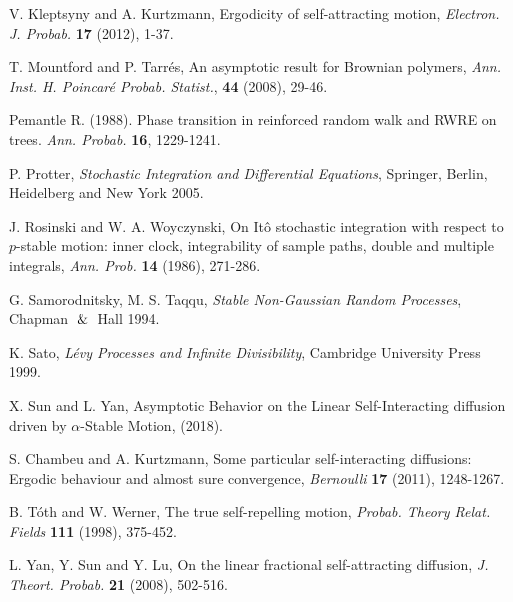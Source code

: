 \documentclass[11pt]{amsart}
\theoremstyle{plain}
\numberwithin{equation}{section}
\begin{document}
\begin{thebibliography}{0}
  V. Kleptsyny and A. Kurtzmann, Ergodicity of self-attracting motion, {\em Electron. J. Probab.} {\bf 17} (2012), 1-37.
  
  T. Mountford and P. Tarr\'es, An asymptotic result for Brownian polymers, {\it Ann. Inst. H. Poincar\'e Probab. Statist.}, {\bf 44} (2008), 29-46.
  
  Pemantle R. (1988). Phase transition in reinforced random walk and RWRE on trees. {\it Ann. Probab.} {\bf 16}, 1229-1241.
  
  P. Protter, {\it Stochastic Integration and Differential Equations}, Springer, Berlin, Heidelberg and New York 2005.
  
  J. Rosinski and W. A. Woyczynski, On It\^o stochastic integration with respect to $p$-stable motion: inner clock, integrability of sample paths, double and multiple integrals, {\it Ann. Prob.} {\bf 14} (1986), 271-286.
  
  G. Samorodnitsky, M. S. Taqqu, {\it Stable Non-Gaussian Random Processes}, Chapman $\And$ Hall 1994.
  
  K. Sato, {\it L\'evy Processes and Infinite Divisibility}, Cambridge University Press 1999.
  
  X. Sun and L. Yan, Asymptotic Behavior on the Linear Self-Interacting diffusion driven by $\alpha$-Stable Motion, (2018).
  
  S. Chambeu and A. Kurtzmann, Some particular self-interacting diffusions:
  Ergodic behaviour and almost sure convergence, {\em Bernoulli} {\bf 17} (2011), 1248-1267.
  
  B. T\'oth and W. Werner, The true self-repelling motion, {\it Probab. Theory Relat. Fields} {\bf 111} (1998), 375-452.
  
  L. Yan, Y. Sun and Y. Lu, On the linear fractional self-attracting diffusion, {\it J. Theort. Probab.} {\bf 21} (2008), 502-516.
  \end{thebibliography}
\end{document}
